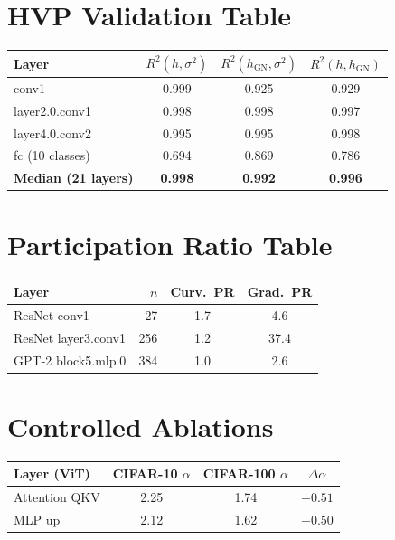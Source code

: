 \documentclass{article}
\begin{document}
\appendix

\section{HVP Validation Table}\label{app:hvp-table}

\begin{center}
\small
\begin{tabular}{lccc}
\toprule
\textbf{Layer} & $R^2(h, \sigma^2)$ & $R^2(h_{\mathrm{GN}}, \sigma^2)$ & $R^2(h, h_{\mathrm{GN}})$ \\
\midrule
conv1 & 0.999 & 0.925 & 0.929 \\
layer2.0.conv1 & 0.998 & 0.998 & 0.997 \\
layer4.0.conv2 & 0.995 & 0.995 & 0.998 \\
fc (10 classes) & 0.694 & 0.869 & 0.786 \\
\midrule
\textbf{Median (21 layers)} & \textbf{0.998} & \textbf{0.992} & \textbf{0.996} \\
\bottomrule
\end{tabular}
\end{center}

\section{Participation Ratio Table}\label{app:pr-table}

\begin{center}
\small
\begin{tabular}{lrcc}
\toprule
\textbf{Layer} & $n$ & Curv.\ PR & Grad.\ PR \\
\midrule
ResNet conv1 & 27 & 1.7 & 4.6 \\
ResNet layer3.conv1 & 256 & 1.2 & 37.4 \\
GPT-2 block5.mlp.0 & 384 & 1.0 & 2.6 \\
\bottomrule
\end{tabular}
\end{center}

\section{Controlled Ablations}\label{app:ablations}

\begin{center}
\small
\begin{tabular}{lccc}
\toprule
\textbf{Layer (ViT)} & CIFAR-10 $\alpha$ & CIFAR-100 $\alpha$ & $\Delta\alpha$ \\
\midrule
Attention QKV & 2.25 & 1.74 & $-0.51$ \\
MLP up & 2.12 & 1.62 & $-0.50$ \\
\bottomrule
\end{tabular}
\end{center}
\end{document}
